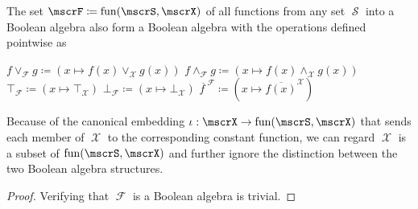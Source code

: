 \begin{proposition}\label{thm:functions_into_boolean_algebra_form_boolean_algebra}
  The set \( \mscrF \coloneqq \fun(\mscrS, \mscrX) \) of all functions from any set \( \mscrS \) into a Boolean algebra also form a Boolean algebra with the operations defined pointwise as
  \begin{reflist}
     \( f \vee_{\mscrF} g \coloneqq (x \mapsto f(x) \vee_{\mscrX} g(x)) \)
     \( f \wedge_{\mscrF} g \coloneqq (x \mapsto f(x) \wedge_{\mscrX} g(x)) \)
     \( \top_{\mscrF} \coloneqq (x \mapsto \top_{\mscrX}) \)
     \( \bot_{\mscrF} \coloneqq (x \mapsto \bot_{\mscrX}) \)
     \( \overline{f \ }^{\mscrF} \coloneqq (x \mapsto \overline{f(x)}^{\mscrX}) \)
  \end{reflist}

  Because of the canonical embedding \( \iota: \mscrX \to \fun(\mscrS, \mscrX) \) that sends each member of \( \mscrX \) to the corresponding constant function, we can regard \( \mscrX \) is a subset of \( \fun(\mscrS, \mscrX) \) and further ignore the distinction between the two Boolean algebra structures.
\end{proposition}
\begin{proof}
  Verifying that \( \mscrF \) is a Boolean algebra is trivial.
\end{proof}
